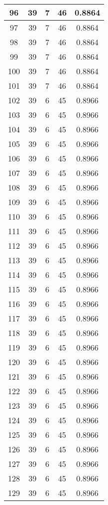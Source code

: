 \documentclass[letterpaper, 12pt]{article}
\begin{document}
\begin{longtable}{|c|c|c|c|c|}
\hline
96 & 39 & 7 & 46 & 0.8864 \\
\hline
97 & 39 & 7 & 46 & 0.8864 \\
\hline
98 & 39 & 7 & 46 & 0.8864 \\
\hline
99 & 39 & 7 & 46 & 0.8864 \\
\hline
100 & 39 & 7 & 46 & 0.8864 \\
\hline
101 & 39 & 7 & 46 & 0.8864 \\
\hline
102 & 39 & 6 & 45 & 0.8966 \\
\hline
103 & 39 & 6 & 45 & 0.8966 \\
\hline
104 & 39 & 6 & 45 & 0.8966 \\
\hline
105 & 39 & 6 & 45 & 0.8966 \\
\hline
106 & 39 & 6 & 45 & 0.8966 \\
\hline
107 & 39 & 6 & 45 & 0.8966 \\
\hline
108 & 39 & 6 & 45 & 0.8966 \\
\hline
109 & 39 & 6 & 45 & 0.8966 \\
\hline
110 & 39 & 6 & 45 & 0.8966 \\
\hline
111 & 39 & 6 & 45 & 0.8966 \\
\hline
112 & 39 & 6 & 45 & 0.8966 \\
\hline
113 & 39 & 6 & 45 & 0.8966 \\
\hline
114 & 39 & 6 & 45 & 0.8966 \\
\hline
115 & 39 & 6 & 45 & 0.8966 \\
\hline
116 & 39 & 6 & 45 & 0.8966 \\
\hline
117 & 39 & 6 & 45 & 0.8966 \\
\hline
118 & 39 & 6 & 45 & 0.8966 \\
\hline
119 & 39 & 6 & 45 & 0.8966 \\
\hline
120 & 39 & 6 & 45 & 0.8966 \\
\hline
121 & 39 & 6 & 45 & 0.8966 \\
\hline
122 & 39 & 6 & 45 & 0.8966 \\
\hline
123 & 39 & 6 & 45 & 0.8966 \\
\hline
124 & 39 & 6 & 45 & 0.8966 \\
\hline
125 & 39 & 6 & 45 & 0.8966 \\
\hline
126 & 39 & 6 & 45 & 0.8966 \\
\hline
127 & 39 & 6 & 45 & 0.8966 \\
\hline
128 & 39 & 6 & 45 & 0.8966 \\
\hline
129 & 39 & 6 & 45 & 0.8966 \\

\end{longtable}
\end{document}
